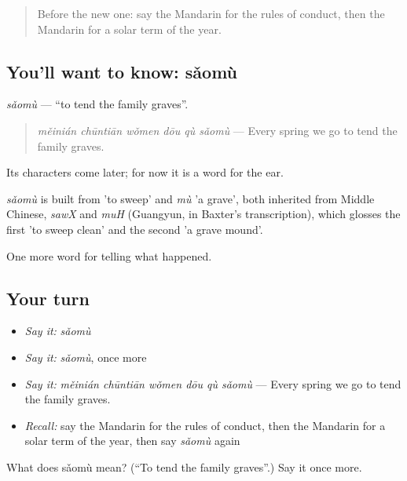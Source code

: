 \label{lesson:ZH-C340-saomu}



\begin{quote}
Before the new one: say the Mandarin for the rules of conduct, then the Mandarin for a solar term of the year.
\end{quote}

\subsection*{You'll want to know: sǎomù}
\emph{sǎomù} — \textquotedblleft{}to tend the family graves\textquotedblright{}.

\begin{quote}
\emph{měinián chūntiān wǒmen dōu qù sǎomù} — Every spring we go to tend the family graves.
\end{quote}

Its characters come later; for now it is a word for the ear.

\begin{cousinweb}
\emph{sǎomù} is built from  'to sweep' and \emph{mù} 'a grave', both inherited from Middle Chinese, \emph{sawX} and \emph{muH} (Guangyun, in Baxter's transcription), which glosses the first 'to sweep clean' and the second 'a grave mound'.
\end{cousinweb}

\begin{grammarlens}[title={What you've built}]
One more word for telling what happened.
\end{grammarlens}

\subsection*{Your turn}
\begin{itemize}
\raggedright
  \item \emph{Say it:} \emph{sǎomù}
  \item \emph{Say it:} \emph{sǎomù}, once more
  \item \emph{Say it:} \emph{měinián chūntiān wǒmen dōu qù sǎomù} — Every spring we go to tend the family graves.
  \item \emph{Recall:} say the Mandarin for the rules of conduct, then the Mandarin for a solar term of the year, then say \emph{sǎomù} again
\end{itemize}

\begin{tcolorbox}[breakable,colback=teal!4,colframe=teal!35!black,title={Before you move on}]
What does sǎomù mean? (\textquotedblleft{}To tend the family graves\textquotedblright{}.) Say it once more.
\end{tcolorbox}
